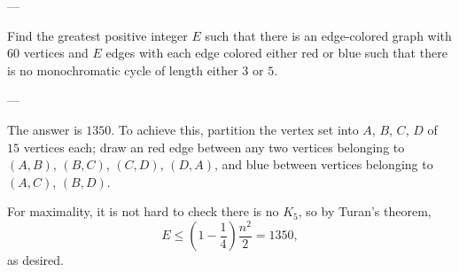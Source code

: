 
---

Find the greatest positive integer $E$ such that there is an edge-colored graph with $60$ vertices and $E$ edges with each edge colored either red or blue such that there is no monochromatic cycle of length either $3$ or $5$.

---

The answer is $1350$. To achieve this, partition the vertex set into $A$, $B$, $C$, $D$ of $15$ vertices each; draw an red edge between any two vertices belonging to $(A,B)$, $(B,C)$, $(C,D)$, $(D,A)$, and blue between vertices belonging to $(A,C)$, $(B,D)$.

For maximality, it is not hard to check there is no $K_5$, so by Turan's theorem, \[E\le\left(1-\frac14\right)\frac{n^2}2=1350,\]
as desired.

